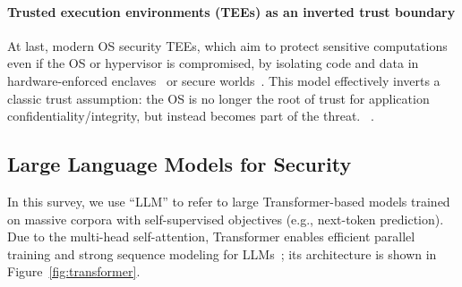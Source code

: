 \paragraph{\textbf{Trusted execution environments (TEEs) as an inverted trust boundary}}
At last, modern OS security  TEEs, which aim to protect sensitive computations even if the OS or hypervisor is compromised, by isolating code and data in hardware-enforced enclaves~\cite{costan2017secure} or secure worlds~\cite{li2019research, Alves2004TrustZoneI}.
This model effectively inverts a classic trust assumption: the OS is no longer the root of trust for application confidentiality/integrity, but instead becomes part of the threat. 
~.


\subsection{Large Language Models for Security}





In this survey, we use ``LLM'' to refer to large Transformer-based models trained on massive corpora with self-supervised objectives (e.g., next-token prediction).
Due to the multi-head self-attention, Transformer enables efficient parallel training and strong sequence modeling for LLMs~\cite{vaswani17}; 
its architecture is shown in Figure~\ref{fig:transformer}.

